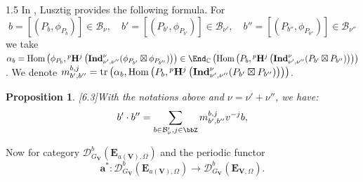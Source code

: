 \documentclass[10pt]{amsart}
\newtheorem{proposition}[theorem]{Proposition}
\def\bbC{{\mathbb C}}  \def\bbE{{\mathbb E}}  \def\bbP{{\mathbb P}}
\def\Hom{\mbox{\rm Hom}}  \def\ap{\mbox{\rm ap}}
\def\Ind{\mathbf{Ind}}
\begin{document}
\begin{spacing}{1.5}
In \cite[4.4]{lusztig1998canonical}, Lusztig provides the following formula. For 
\[
b = [(P_b, \phi_{P_b})] \in \mathcal{B}_{\nu}, \quad
b' = [(P_{b'}, \phi_{P_{b'}})] \in \mathcal{B}_{\nu'}, \quad
b'' = [(P_{b''}, \phi_{P_{b''}})] \in \mathcal{B}_{\nu''}
\]
we take $\alpha_{b}=\Hom\left( \phi_{P_b}, {^p}\mathbf{H}^j \left( \Ind_{\nu', \nu''}^{\nu}(\phi_{P_{b'}} \boxtimes \phi_{P_{b''}}) \right) \right)\in \End_{\bbC}\left(\Hom\left( P_b, {^p}\mathbf{H}^j \left( \Ind_{\nu', \nu''}^{\nu}(P_{b'} \boxtimes P_{b''}) \right) \right)\right)$. %
We denote $m_{b',b''}^{b,j}=\operatorname{tr}\left( \alpha_b, \Hom\left( P_b, {^p}\mathbf{H}^j \left( \Ind_{\nu', \nu''}^{\nu}(P_{b'} \boxtimes P_{b''}) \right) \right) \right)$.
\begin{proposition}\cite{lusztig1998canonical}[6.3]\label{prop L}
    With the notations above and $\nu = \nu' + \nu''$, we have:
\begin{equation} \label{1}
b' \cdot b'' = \sum_{b \in \mathcal{B}_{\nu}',j\in \bbZ} m_{b',b''}^{b,j} v^{-j} b,
\end{equation}



\end{proposition}

Now for category $\mathcal{D}^b_{G_{\mathbf{V}}}(\mathbf{E}_{a(\mathbf{V}), \Omega})$ and the periodic functor
$$
\mathbf{a}^*: \mathcal{D}^b_{G_{\mathbf{V}}}(\mathbf{E}_{a(\mathbf{V}), \Omega}) \to \mathcal{D}^b_{G_{\mathbf{V}}}(\mathbf{E}_{\mathbf{V}, \Omega}).
$$


\end{spacing}
\end{document}
